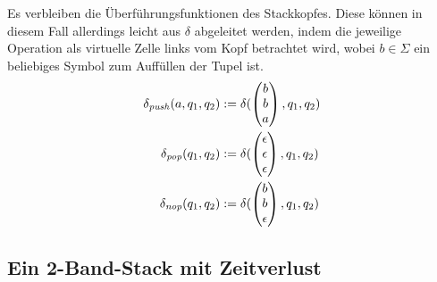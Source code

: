 \documentclass{article}
\begin{document}
Es verbleiben die Überführungsfunktionen des Stackkopfes. Diese können in diesem Fall allerdings leicht aus $\delta$ abgeleitet werden, indem die jeweilige Operation als virtuelle Zelle links vom Kopf betrachtet wird, wobei $b \in \Sigma$ ein beliebiges Symbol zum Auffüllen der Tupel ist.
\begin{align*}
    \delta_{\mathit{push}}(a, q_1, q_2) &:= \delta(\begin{pmatrix}b\\b\\a\end{pmatrix}, q_1, q_2) \\
    \delta_{\mathit{pop}}(q_1, q_2) &:= \delta(\begin{pmatrix}\epsilon\\\epsilon\\\epsilon\end{pmatrix}, q_1, q_2) \\
    \delta_{\mathit{nop}}(q_1, q_2) &:= \delta(\begin{pmatrix}b\\b\\\epsilon\end{pmatrix}, q_1, q_2) \\
\end{align*}

\subsection{Ein 2-Band-Stack mit Zeitverlust}
\end{document}
